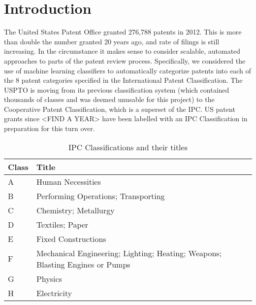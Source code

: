 \section{Introduction}
The United States Patent Office granted 276,788 patents in 2012\cite{USPTO:2013:stats}. This is more than double the number granted 20 years ago, and rate of filings is still increasing. In the circumstance it makes sense to consider scalable, automated approaches to parts of the patent review process. Specifically, we considered the use of machine learning classifiers to automatically categorize patents into each of the 8 patent categories specified in the International Patent Classification\cite{ipc:2013:guide}. The USPTO is moving from its previous classification system (which contained thousands of classes and was deemed unusable for this project) to the Cooperative Patent Classification, which is a superset of the IPC. US patent grants since <FIND A YEAR> have been labelled with an IPC Classification in preparation for this turn over.



\begin{table}[H]
	\centering
	\begin{tabular}{ | l | l |}
		\hline
		\textbf{Class} & \textbf{Title} \\
				\hline
		A & Human Necessities \\
				\hline
		B & Performing Operations; Transporting \\
				\hline
		C & Chemistry; Metallurgy \\
				\hline
		D & Textiles; Paper \\
				\hline
		E & Fixed Constructions \\
				\hline
		F & Mechanical Engineering; Lighting; Heating; Weapons; Blasting Engines or Pumps \\
		G & Physics \\
				\hline
		H & Electricity \\
				\hline
	\end{tabular}
	\caption{IPC Classifications and their titles}
\end{table}



